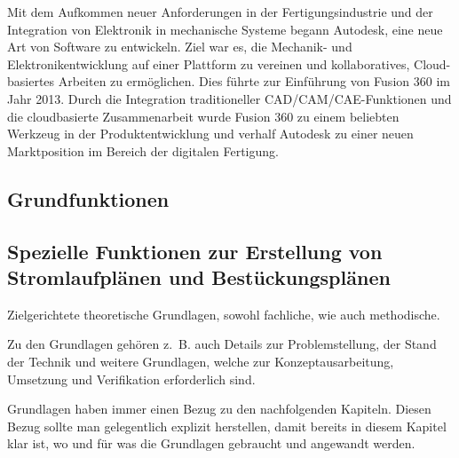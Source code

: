 Mit dem Aufkommen neuer Anforderungen in der Fertigungsindustrie und der Integration von Elektronik in mechanische Systeme begann Autodesk, eine neue Art von Software zu entwickeln. Ziel war es, die Mechanik- und Elektronikentwicklung auf einer Plattform zu vereinen und kollaboratives, Cloud-basiertes Arbeiten zu ermöglichen. Dies führte zur Einführung von Fusion 360 im Jahr 2013. \autocite{wikipedia_autodesk_deutsch}
Durch die Integration traditioneller CAD/CAM/CAE-Funktionen und die cloudbasierte Zusammenarbeit wurde Fusion 360 zu einem beliebten Werkzeug in der Produktentwicklung und verhalf Autodesk zu einer neuen Marktposition im Bereich der digitalen Fertigung.
\subsection{Grundfunktionen}
\subsection{Spezielle Funktionen zur Erstellung von Stromlaufplänen und Bestückungsplänen}


Zielgerichtete theoretische Grundlagen, sowohl fachliche, wie auch methodische.

Zu den Grundlagen gehören z.~B. auch Details zur Problemstellung, der Stand der Technik und weitere Grundlagen, welche zur Konzeptausarbeitung, Umsetzung und Verifikation erforderlich sind.

Grundlagen haben immer einen Bezug zu den nachfolgenden Kapiteln. Diesen Bezug sollte man gelegentlich explizit herstellen, damit bereits in diesem Kapitel klar ist, wo und für was die Grundlagen gebraucht und angewandt werden.